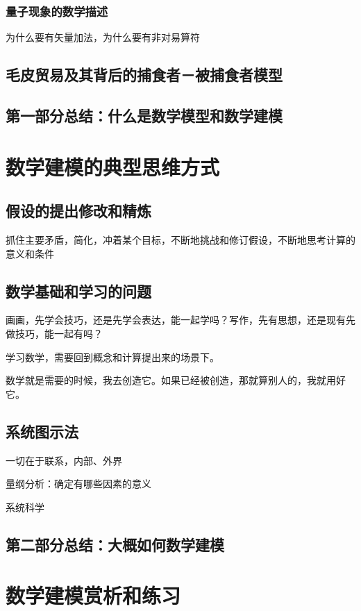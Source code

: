 \documentclass{ctexbook}
\newcommand{\ChapLabel}[1]{\label{#1}}
\begin{document}
\section{量子现象的数学描述}
为什么要有矢量加法，为什么要有非对易算符

\chapter{毛皮贸易及其背后的捕食者－被捕食者模型}
\ChapLabel{Chap:Lotka-Volterra}

\chapter{第一部分总结：什么是数学模型和数学建模}
\ChapLabel{Chap:Part1}

\part{数学建模的典型思维方式}

\chapter{假设的提出修改和精炼}
\ChapLabel{Chap:Assumption}
抓住主要矛盾，简化，冲着某个目标，不断地挑战和修订假设，不断地思考计算的意义和条件

\chapter{数学基础和学习的问题}
\ChapLabel{Chap:Basis}
画画，先学会技巧，还是先学会表达，能一起学吗？写作，先有思想，还是现有先做技巧，能一起有吗？

学习数学，需要回到概念和计算提出来的场景下。

数学就是需要的时候，我去创造它。如果已经被创造，那就算别人的，我就用好它。

\chapter{系统图示法}
\ChapLabel{Chap:Diagram}
一切在于联系，内部、外界

量纲分析：确定有哪些因素的意义

系统科学
\chapter{第二部分总结：大概如何数学建模}
\ChapLabel{Chap:Part2}

\part{数学建模赏析和练习}
\end{document}
